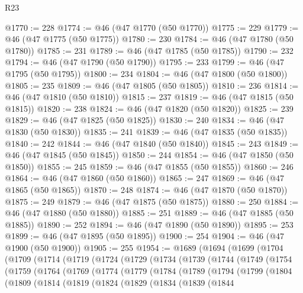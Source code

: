 \begin{lexlean}{R23}
\begin{coremodule}
@1770 := 228
@1774 := @46 (@47 @1770 (@50 @1770))
@1775 := 229
@1779 := @46 (@47 @1775 (@50 @1775))
@1780 := 230
@1784 := @46 (@47 @1780 (@50 @1780))
@1785 := 231
@1789 := @46 (@47 @1785 (@50 @1785))
@1790 := 232
@1794 := @46 (@47 @1790 (@50 @1790))
@1795 := 233
@1799 := @46 (@47 @1795 (@50 @1795))
@1800 := 234
@1804 := @46 (@47 @1800 (@50 @1800))
@1805 := 235
@1809 := @46 (@47 @1805 (@50 @1805))
@1810 := 236
@1814 := @46 (@47 @1810 (@50 @1810))
@1815 := 237
@1819 := @46 (@47 @1815 (@50 @1815))
@1820 := 238
@1824 := @46 (@47 @1820 (@50 @1820))
@1825 := 239
@1829 := @46 (@47 @1825 (@50 @1825))
@1830 := 240
@1834 := @46 (@47 @1830 (@50 @1830))
@1835 := 241
@1839 := @46 (@47 @1835 (@50 @1835))
@1840 := 242
@1844 := @46 (@47 @1840 (@50 @1840))
@1845 := 243
@1849 := @46 (@47 @1845 (@50 @1845))
@1850 := 244
@1854 := @46 (@47 @1850 (@50 @1850))
@1855 := 245
@1859 := @46 (@47 @1855 (@50 @1855))
@1860 := 246
@1864 := @46 (@47 @1860 (@50 @1860))
@1865 := 247
@1869 := @46 (@47 @1865 (@50 @1865))
@1870 := 248
@1874 := @46 (@47 @1870 (@50 @1870))
@1875 := 249
@1879 := @46 (@47 @1875 (@50 @1875))
@1880 := 250
@1884 := @46 (@47 @1880 (@50 @1880))
@1885 := 251
@1889 := @46 (@47 @1885 (@50 @1885))
@1890 := 252
@1894 := @46 (@47 @1890 (@50 @1890))
@1895 := 253
@1899 := @46 (@47 @1895 (@50 @1895))
@1900 := 254
@1904 := @46 (@47 @1900 (@50 @1900))
@1905 := 255
@1954 := @1689
    (@1694
      (@1699
        (@1704
          (@1709
            (@1714
              (@1719
                (@1724
                  (@1729
                    (@1734
                      (@1739
                        (@1744
                          (@1749
                            (@1754
                              (@1759
                                (@1764
                                  (@1769
                                    (@1774
                                      (@1779
                                        (@1784
                                          (@1789
                                            (@1794
                                              (@1799
                                                (@1804
                                                  (@1809
                                                    (@1814
                                                      (@1819
                                                        (@1824
                                                          (@1829
                                                            (@1834
                                                              (@1839
                                                                (@1844

\end{coremodule}
\end{lexlean}
